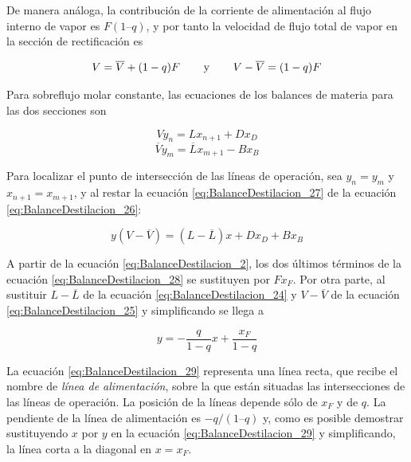 \documentclass[11pt]{book}
\begin{document}
De manera análoga, la contribución de la corriente de alimentación al flujo interno de vapor es $F(1 – q)$, y por tanto la velocidad de flujo total de vapor en la sección de rectificación es

\begin{equation}
    \label{eq:BalanceDestilacion_25}
    V = \overline{V} + (1-q)F \hspace{0.75cm} \textrm{y} \hspace{0.75cm} V - \overline{V} = (1-q)F
\end{equation}

Para sobreflujo molar constante, las ecuaciones de los balances de materia para las dos secciones son

\begin{equation}
    \label{eq:BalanceDestilacion_26}
    V y_n = L x_{n+1} + D x_D
\end{equation}
\begin{equation}
    \label{eq:BalanceDestilacion_27}
    \overline{V} y_m = \overline{L} x_{m+1} - B x_B
\end{equation}

Para localizar el punto de intersección de las líneas de operación, sea $y_n = y_m$ y $x_{n+1} = x_{m+1}$, y al restar la ecuación \ref{eq:BalanceDestilacion_27} de la ecuación \ref{eq:BalanceDestilacion_26}:

\begin{equation}
    \label{eq:BalanceDestilacion_28}
    y \left( V - \overline{V} \right) = \left( L - \overline{L} \right) x + Dx_D + B x_B
\end{equation}

A partir de la ecuación \ref{eq:BalanceDestilacion_2}, los dos últimos términos de la ecuación \ref{eq:BalanceDestilacion_28} se sustituyen por $Fx_F$. Por otra parte, al sustituir $L - \overline{L}$ de la ecuación \ref{eq:BalanceDestilacion_24} y $V - \overline{V}$ de la ecuación \ref{eq:BalanceDestilacion_25} y simplificando se llega a

\begin{equation}
    \label{eq:BalanceDestilacion_29}
   y = - \frac{q}{1-q} x + \frac{x_F}{1-q}
\end{equation}

La ecuación \ref{eq:BalanceDestilacion_29} representa una línea recta, que recibe el nombre de \textit{línea de alimentación}, sobre la que están situadas las intersecciones de las líneas de operación. La posición de la líneas depende sólo de $x_F$ y de $q$. La pendiente de la línea de alimentación es $-q/(1 – q)$ y, como es posible demostrar sustituyendo $x$ por $y$ en la ecuación \ref{eq:BalanceDestilacion_29} y simplificando, la línea corta a la diagonal en $x = x_F$.
\end{document}
